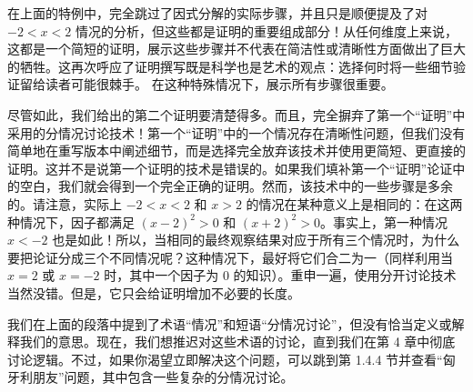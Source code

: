 在上面的特例中，完全跳过了因式分解的实际步骤，并且只是顺便提及了对 $-2 < x < 2$ 情况的分析，但这些都是证明的重要组成部分！从任何维度上来说，这都是一个简短的证明，展示这些步骤并不代表在简洁性或清晰性方面做出了巨大的牺牲。这再次呼应了证明撰写既是科学也是艺术的观点：选择何时将一些细节验证留给读者可能很棘手。 在这种特殊情况下，展示所有步骤很重要。

尽管如此，我们给出的第二个证明要清楚得多。而且，完全摒弃了第一个``证明''中采用的分情况讨论技术！第一个``证明''中的一个情况存在清晰性问题，但我们没有简单地在重写版本中阐述细节，而是选择完全放弃该技术并使用更简短、更直接的证明。这并不是说第一个证明的技术是错误的。如果我们填补第一个``证明''论证中的空白，我们就会得到一个完全正确的证明。然而，该技术中的一些步骤是多余的。请注意，实际上 $-2 < x < 2$ 和 $x > 2$ 的情况在某种意义上是相同的：在这两种情况下，因子都满足 $(x - 2)^2 > 0$ 和 $(x + 2)^2 > 0$。事实上，第一种情况 $x<-2$ 也是如此！所以，当相同的最终观察结果对应于所有三个情况时，为什么要把论证分成三个不同情况呢？这种情况下，最好将它们合二为一（同样利用当 $x = 2$ 或 $x = -2$ 时，其中一个因子为 $0$ 的知识）。重申一遍，使用分开讨论技术当然没错。但是，它只会给证明增加不必要的长度。

我们在上面的段落中提到了术语``情况''和短语``分情况讨论''，但没有恰当定义或解释我们的意思。现在，我们想推迟对这些术语的讨论，直到我们在第 4 章中彻底讨论逻辑。不过，如果你渴望立即解决这个问题，可以跳到第 1.4.4 节并查看``匈牙利朋友''问题，其中包含一些复杂的分情况讨论。

